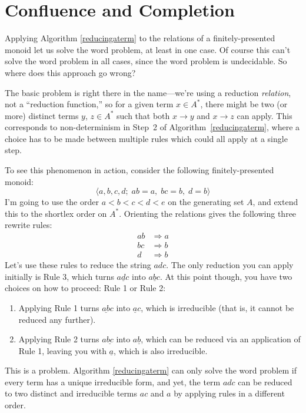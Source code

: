 \documentclass[a4paper,headsepline,bibliography=totoc,toc=flat,fleqn,twoside=semi]{scrbook}
\theoremstyle{definition}
\theoremstyle{definition}
\theoremstyle{definition}
\begin{document}
\section{Confluence and Completion}\label{confluenceandcompletion}
Applying Algorithm \ref{reducingaterm} to the relations of a finitely-presented monoid let us solve the word problem, at least in one case. Of course this can't solve the word problem in all cases, since the word problem is undecidable. So where does this approach go wrong?

The basic problem is right there in the name---we're using a reduction \emph{relation}, not a ``reduction function,'' so for a given term $x\in A^*$, there might be two (or more) distinct terms $y$, $z\in A^*$ such that both $x\rightarrow y$ and $x\rightarrow z$ can apply. This corresponds to non-determinism in Step~2 of Algorithm~\ref{reducingaterm}, where a choice has to be made between multiple rules which could all apply at a single step.

To see this phenomenon in action, consider the following finitely-presented monoid:
\[\langle a, b, c, d;\; ab=a,\; bc=b,\; d=b\rangle\]
I'm going to use the order $a<b<c<d<e$ on the generating set $A$, and extend this to the shortlex order on $A^*$. Orienting the relations gives the following three rewrite rules:
\begin{align}
ab&\Rightarrow a\tag{1}\\
bc&\Rightarrow b\tag{2}\\
d&\Rightarrow b\tag{3}
\end{align}
Let's use these rules to reduce the string $adc$. The only reduction you can apply initially is Rule 3, which turns $a\underline{d}c$ into $a\underline{b}c$. At this point though, you have two choices on how to proceed: Rule 1 or Rule 2:
\begin{enumerate}
\item Applying Rule 1 turns $\underline{ab}c$ into $\underline{a}c$, which is irreducible (that is, it cannot be reduced any further).
\item Applying Rule 2 turns $a\underline{bc}$ into $a\underline{b}$, which can be reduced via an application of Rule 1, leaving you with $\underline{a}$, which is also irreducible.
\end{enumerate}
This is a problem. Algorithm \ref{reducingaterm} can only solve the word problem if every term has a unique irreducible form, and yet, the term $adc$ can be reduced to two distinct and irreducible terms $ac$ and $a$ by applying rules in a different order.
\end{document}
